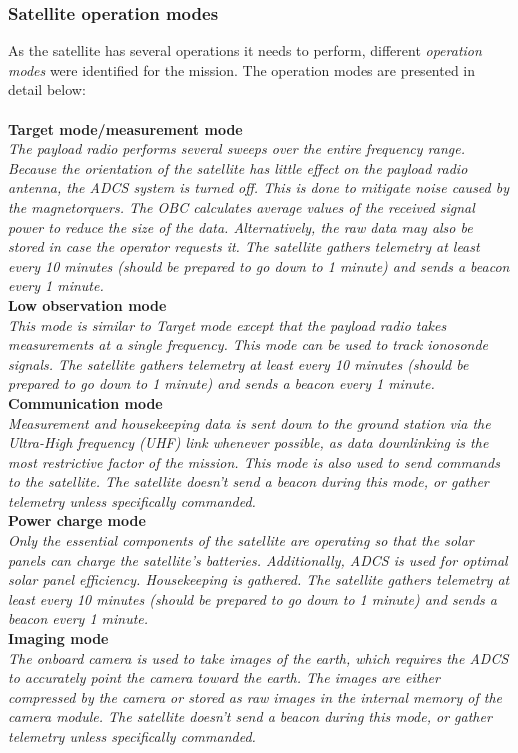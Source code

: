 \documentclass[english,12pt,a4paper,pdftex,elec,utf8]{aaltothesis}
\begin{document}
\subsubsection{Satellite operation modes}
As the satellite has several operations it needs to perform, different \textit{operation modes} were identified for the mission.
The operation modes are presented in detail below:\\
\\
\textbf{Target mode/measurement mode}\\
\textit{The payload radio performs several sweeps over the entire frequency range. Because the orientation of the satellite has little effect on the payload radio antenna, the ADCS system is turned off. This is done to mitigate noise caused by the magnetorquers. The OBC calculates average values of the received signal power to reduce the size of the data. Alternatively, the raw data may also be stored in case the operator requests it. The satellite gathers telemetry at least every 10 minutes (should be prepared to go down to 1 minute) and sends a beacon every 1 minute.}\\
\textbf{Low observation mode}\\
\textit{This mode is similar to Target mode except that the payload radio takes measurements at a single frequency. This mode can be used to track ionosonde signals. The satellite gathers telemetry at least every 10 minutes (should be prepared to go down to 1 minute) and sends a beacon every 1 minute.}\\
\textbf{Communication mode}\\
\textit{Measurement and housekeeping data is sent down to the ground station via the Ultra-High frequency (UHF) link whenever possible, as data downlinking is the most restrictive factor of the mission. This mode is also used to send commands to the satellite. The satellite doesn't send a beacon during this mode, or gather telemetry unless specifically commanded.}\\
\textbf{Power charge mode}\\
\textit{Only the essential components of the satellite are operating so that the solar panels can charge the satellite's batteries. Additionally, ADCS is used for optimal solar panel efficiency. Housekeeping is gathered. The satellite gathers telemetry at least every 10 minutes (should be prepared to go down to 1 minute) and sends a beacon every 1 minute.}\\
\textbf{Imaging mode}\\
\textit{The onboard camera is used to take images of the earth, which requires the ADCS to accurately point the camera toward the earth. The images are either compressed by the camera or stored as raw images in the internal memory of the camera module. The satellite doesn't send a beacon during this mode, or gather telemetry unless specifically commanded.}\\
\end{document}
